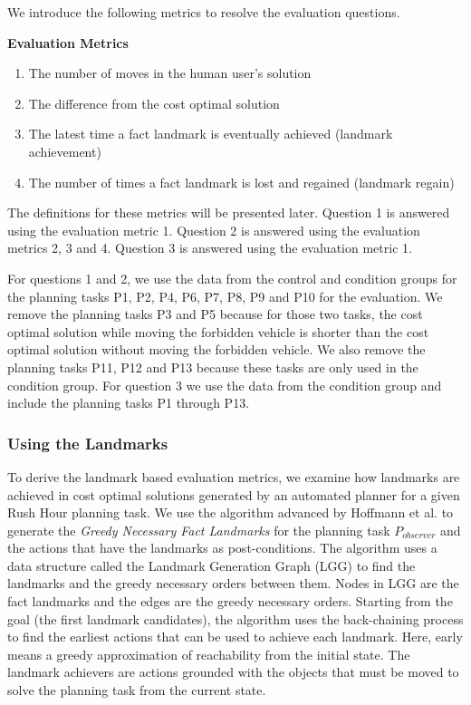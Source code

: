 We introduce the following metrics to resolve the evaluation questions.

\textbf{Evaluation Metrics}
\begin{enumerate}
\item The number of moves in the human user's solution
\item The difference from the cost optimal solution
\item The latest time a fact landmark is eventually achieved (landmark achievement)
\item The number of times a fact landmark is lost and regained (landmark regain)
\end{enumerate}
The definitions for these metrics will be presented later.
Question 1 is answered using the evaluation metric 1.
Question 2 is answered using the evaluation metrics 2, 3 and 4.
Question 3 is answered using the evaluation metric 1.

For questions 1 and 2, we use the data from the control and condition groups for the planning tasks P1, P2, P4, P6, P7, P8, P9 and P10 for the evaluation.
We remove the planning tasks P3 and P5 because for those two tasks, the cost optimal solution while moving the forbidden vehicle is shorter than the cost optimal solution without moving the forbidden vehicle.
We also remove the planning tasks P11, P12 and P13 because these tasks are only used in the condition group.
For question 3 we use the data from the condition group and include the planning tasks P1 through P13.

\subsubsection{Using the Landmarks}
\label{sec:usingthelandmarks}
To derive the landmark based evaluation metrics, we examine how landmarks are achieved in cost optimal solutions generated by an automated planner for a given Rush Hour planning task.
We use the algorithm advanced by Hoffmann et al. \citeyear{hoffman2004lm} to generate the \textit{Greedy Necessary Fact Landmarks} for the planning task $P_{observer}$ and the actions that have the landmarks as post-conditions.
The algorithm uses a data structure called the Landmark Generation Graph (LGG) to find the landmarks and the greedy necessary orders between them. 
Nodes in LGG are the fact landmarks and the edges are the greedy necessary orders. 
Starting from the goal (the first landmark candidates), the algorithm uses the back-chaining process to find the earliest actions that can be used to achieve each landmark. 
Here, early means a greedy approximation of reachability from the initial state. 
The landmark achievers are actions grounded with the objects that must be moved to solve the planning task from the current state.

